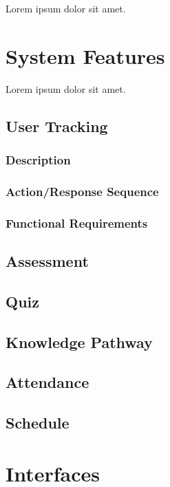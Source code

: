 Lorem ipsum dolor sit amet.

\section{System Features}

Lorem ipsum dolor sit amet.

\subsection{User Tracking}

\subsubsection{Description}

\subsubsection{Action/Response Sequence}

\subsubsection{Functional Requirements}

\subsection{Assessment}

\subsection{Quiz}

\subsection{Knowledge Pathway}

\subsection{Attendance}

\subsection{Schedule}

\section{Interfaces}


